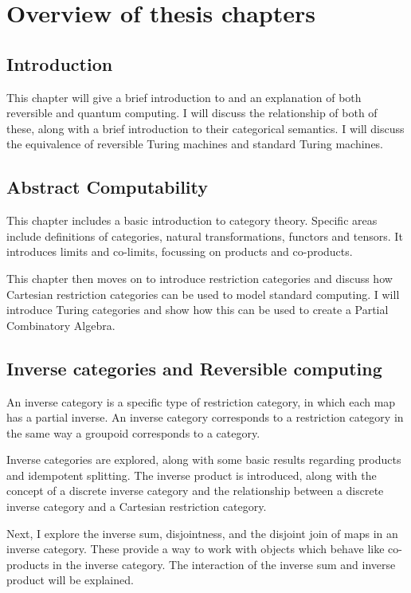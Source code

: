 \chapter*{Overview of thesis chapters}

\section*{Introduction}

This chapter will give a brief introduction to and an explanation of both reversible and quantum
computing. I will discuss the relationship of both of these, along with a brief introduction to
their categorical semantics. I will discuss the equivalence of reversible Turing machines and
standard Turing machines.



\section*{Abstract Computability}

This chapter includes a basic introduction to category theory. Specific areas include definitions
of categories, natural transformations, functors and tensors. It introduces limits and
co-limits, focussing on products and co-products.

This chapter then moves on to introduce restriction categories and discuss how Cartesian
restriction categories can be used to model standard computing. I will introduce Turing categories
and show how this can be used to create a Partial Combinatory Algebra.

\section*{Inverse categories and Reversible computing}

An inverse category is a specific type of restriction category, in which each map has a partial
inverse. An inverse category corresponds to a restriction category in the same way a groupoid
corresponds to a category.

Inverse categories are explored, along with some basic results regarding products and idempotent
splitting. The inverse product is introduced, along with the concept of a discrete inverse
category and the relationship between a discrete inverse category and a Cartesian restriction
category.

Next, I explore the inverse sum, disjointness, and the disjoint join of maps in an inverse
category. These provide a way to work with objects which behave like co-products in the inverse
category. The interaction of the inverse sum and inverse product will be explained.

